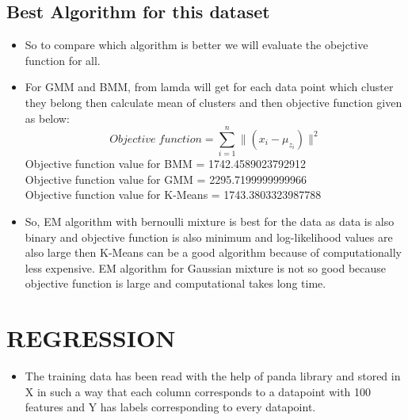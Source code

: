 \documentclass[12pt, a4paper]{article}
\begin{document}
\subsection{Best Algorithm for this dataset}
\begin{itemize}
    \item \large So to compare which algorithm is better we will evaluate the obejctive function for all. 
    \item \large For GMM and BMM, from lamda will get for each data point which cluster they belong then calculate mean of clusters and then objective function given as below:
    \[Objective\;function=\sum\limits_{i=1}^{n}\|(x_i-\mu_{z_i})\|^2\] 
    \newline
    Objective function value for BMM = 1742.4589023792912 \\
    Objective function value for GMM = 2295.7199999999966 \\
    Objective function value for K-Means = 1743.3803323987788
    \item So, EM algorithm with bernoulli mixture is best for the data as data is also binary and objective function is also minimum and log-likelihood values are also large then K-Means can be a good algorithm because of computationally less expensive. EM algorithm for Gaussian mixture is not so good because objective function is large and computational takes long time. 
\end{itemize}
\section{REGRESSION}
\begin{itemize}
    \item \large The training data has been read with the help of panda library and stored in X in such a way that each column corresponds to a datapoint with 100 features and Y has labels corresponding to every datapoint.
\end{itemize}
\end{document}
